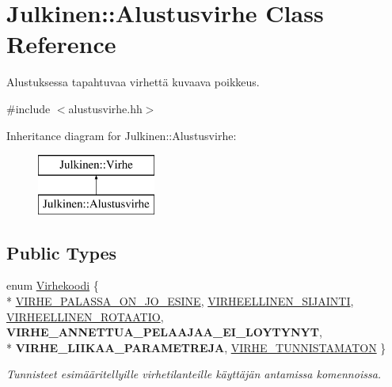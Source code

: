 \hypertarget{class_julkinen_1_1_alustusvirhe}{}\section{Julkinen\+:\+:Alustusvirhe Class Reference}
\label{class_julkinen_1_1_alustusvirhe}


Alustuksessa tapahtuvaa virhettä kuvaava poikkeus.  




{\ttfamily \#include $<$alustusvirhe.\+hh$>$}

Inheritance diagram for Julkinen\+:\+:Alustusvirhe\+:\begin{figure}[H]
\begin{center}
\leavevmode
\includegraphics[height=2.000000cm]{class_julkinen_1_1_alustusvirhe}
\end{center}
\end{figure}
\subsection*{Public Types}
\begin{DoxyCompactItemize}
\item 
enum \hyperlink{class_julkinen_1_1_alustusvirhe_a6c27ff51ee369cf37028b8a7ea0eafc0}{Virhekoodi} \{ \\*
\hyperlink{class_julkinen_1_1_alustusvirhe_a6c27ff51ee369cf37028b8a7ea0eafc0aec9736ad2af67e08e50b87117617f4d6}{V\+I\+R\+H\+E\+\_\+\+P\+A\+L\+A\+S\+S\+A\+\_\+\+O\+N\+\_\+\+J\+O\+\_\+\+E\+S\+I\+N\+E}, 
\hyperlink{class_julkinen_1_1_alustusvirhe_a6c27ff51ee369cf37028b8a7ea0eafc0a733522f56cfb8984ea41adc51baf8741}{V\+I\+R\+H\+E\+E\+L\+L\+I\+N\+E\+N\+\_\+\+S\+I\+J\+A\+I\+N\+T\+I}, 
\hyperlink{class_julkinen_1_1_alustusvirhe_a6c27ff51ee369cf37028b8a7ea0eafc0ac9bd1b203cef3970b61807a7c8d1e004}{V\+I\+R\+H\+E\+E\+L\+L\+I\+N\+E\+N\+\_\+\+R\+O\+T\+A\+A\+T\+I\+O}, 
{\bfseries V\+I\+R\+H\+E\+\_\+\+A\+N\+N\+E\+T\+T\+U\+A\+\_\+\+P\+E\+L\+A\+A\+J\+A\+A\+\_\+\+E\+I\+\_\+\+L\+O\+Y\+T\+Y\+N\+Y\+T}, 
\\*
{\bfseries V\+I\+R\+H\+E\+\_\+\+L\+I\+I\+K\+A\+A\+\_\+\+P\+A\+R\+A\+M\+E\+T\+R\+E\+J\+A}, 
\hyperlink{class_julkinen_1_1_alustusvirhe_a6c27ff51ee369cf37028b8a7ea0eafc0a37797a3ef54020c869caea8d10b51e46}{V\+I\+R\+H\+E\+\_\+\+T\+U\+N\+N\+I\+S\+T\+A\+M\+A\+T\+O\+N}
 \}\begin{DoxyCompactList}\small\item\em Tunnisteet esimääritellyille virhetilanteille käyttäjän antamissa komennoissa. \end{DoxyCompactList}
\end{DoxyCompactItemize}
